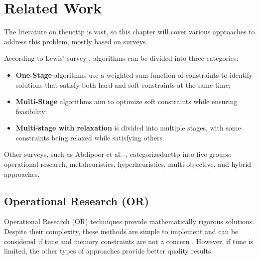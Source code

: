 \pretocmd{\chapter}{\glsresetall}{}{}


\chapter{Related Work}


\label{Related Work}

The literature on the\ac{ucttp} is vast, so this chapter will cover various approaches to address this problem, mostly based on surveys.

According to Lewis' survey \cite{lewis_survey_2008}, algorithms can be divided into three categories:

\begin{itemize}
	\item \textbf{One-Stage} algorithms use a weighted sum function of constraints to identify solutions that satisfy both hard and soft constraints at the same time;
	\item \textbf{Multi-Stage} algorithms aim to optimize soft constraints while ensuring feasibility;
	\item \textbf{Multi-stage with relaxation} is divided into multiple stages, with some constraints being relaxed while satisfying others.
\end{itemize}

Other surveys, such as Abdipoor et al.\ \cite{abdipoor_meta-heuristic_2023}, categorized\ac{ucttp} into five groups: operational research, metaheuristics, hyperheuristics, multi-objective, and hybrid approaches.

\section{Operational Research (OR)}

Operational Research (OR) techniques provide mathematically rigorous solutions. Despite their complexity, these methods are simple to implement and can be considered if time and memory constraints are not a concern \cite{babaei_survey_2015}. However, if time is limited, the other types of approaches provide better quality results. 

